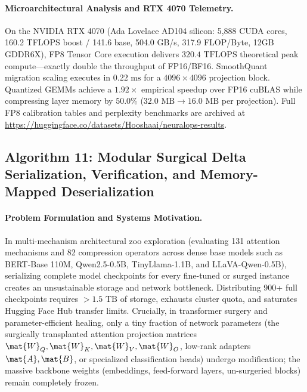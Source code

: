 \paragraph{Microarchitectural Analysis and RTX 4070 Telemetry.}
On the NVIDIA RTX 4070 (Ada Lovelace AD104 silicon: 5,888 CUDA cores, 160.2 TFLOPS boost / 141.6 base, 504.0 GB/s, 317.9 FLOP/Byte, 12GB GDDR6X), FP8 Tensor Core execution delivers $320.4\text{ TFLOPS}$ theoretical peak compute---exactly double the throughput of FP16/BF16. SmoothQuant migration scaling executes in $0.22\text{ ms}$ for a $4096 \times 4096$ projection block. Quantized GEMMs achieve a $1.92\times$ empirical speedup over FP16 cuBLAS while compressing layer memory by $50.0\%$ ($32.0\text{ MB} \to 16.0\text{ MB}$ per projection). Full FP8 calibration tables and perplexity benchmarks are archived at \url{https://huggingface.co/datasets/Hooshaai/neuralops-results}.

\subsection{Algorithm 11: Modular Surgical Delta Serialization, Verification, and Memory-Mapped Deserialization}
\label{subsec:alg_modular_surgical_delta}

\paragraph{Problem Formulation and Systems Motivation.}
In multi-mechanism architectural zoo exploration (evaluating 131 attention mechanisms and 82 compression operators across dense base models such as BERT-Base 110M, Qwen2.5-0.5B, TinyLlama-1.1B, and LLaVA-Qwen-0.5B), serializing complete model checkpoints for every fine-tuned or surged instance creates an unsustainable storage and network bottleneck. Distributing 900+ full checkpoints requires $>1.5\text{ TB}$ of storage, exhausts cluster quota, and saturates Hugging Face Hub transfer limits. Crucially, in transformer surgery and parameter-efficient healing, only a tiny fraction of network parameters (the surgically transplanted attention projection matrices $\mat{W}_Q, \mat{W}_K, \mat{W}_V, \mat{W}_O$, low-rank adapters $\mat{A}, \mat{B}$, or specialized classification heads) undergo modification; the massive backbone weights (embeddings, feed-forward layers, un-surgeried blocks) remain completely frozen.

